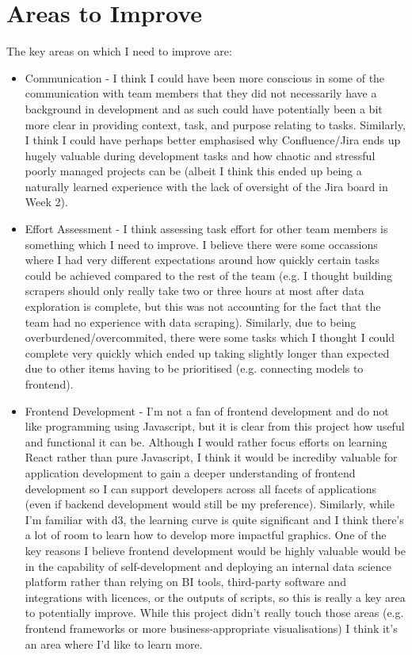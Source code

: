 \documentclass{scrreprt}
\begin{document}
\section{Areas to Improve}\label{AreasToImprove}
The key areas on which I need to improve are:
\begin{itemize}
	\item Communication - I think I could have been more conscious in some of the communication with team members that they did not necessarily have a background in development and as such could have potentially been a bit more clear in providing context, task, and purpose relating to tasks. Similarly, I think I could have perhaps better emphasised why Confluence/Jira ends up hugely valuable during development tasks and how chaotic and stressful poorly managed projects can be (albeit I think this ended up being a naturally learned experience with the lack of oversight of the Jira board in Week 2).
	\item Effort Assessment - I think assessing task effort for other team members is something which I need to improve. I believe there were some occassions where I had very different expectations around how quickly certain tasks could be achieved compared to the rest of the team (e.g. I thought building scrapers should only really take two or three hours at most after data exploration is complete, but this was not accounting for the fact that the team had no experience with data scraping). Similarly, due to being overburdened/overcommited, there were some tasks which I thought I could complete very quickly which ended up taking slightly longer than expected due to other items having to be prioritised (e.g. connecting models to frontend).
	\item Frontend Development - I'm not a fan of frontend development and do not like programming using Javascript, but it is clear from this project how useful and functional it can be. Although I would rather focus efforts on learning React rather than pure Javascript, I think it would be incrediby valuable for application development to gain a deeper understanding of frontend development so I can support developers across all facets of applications (even if backend development would still be my preference). Similarly, while I'm familiar with d3, the learning curve is quite significant and I think there's a lot of room to learn how to develop more impactful graphics. One of the key reasons I believe frontend development would be highly valuable would be in the capability of self-development and deploying an internal data science platform rather than relying on BI tools, third-party software and integrations with licences, or the outputs of scripts, so this is really a key area to potentially improve. While this project didn't really touch those areas (e.g. frontend frameworks or more business-appropriate visualisations) I think it's an area where I'd like to learn more.

\end{itemize}
\end{document}
